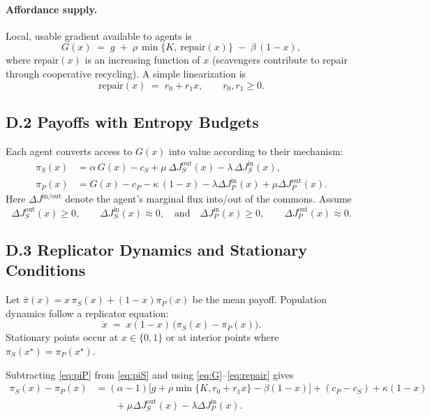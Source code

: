 \documentclass[11pt,a4paper,titlepage]{article}
\theoremstyle{definition}
\begin{document}
\paragraph{Affordance supply.}
Local, usable gradient available to agents is
\begin{equation}
G(x) \;=\; g \;+\; \rho\,\min\{K,~\text{repair}(x)\} \;-\; \beta\,(1-x),
\label{eq:G}
\end{equation}
where $\text{repair}(x)$ is an increasing function of $x$ (scavengers contribute to repair through cooperative recycling). A simple linearization is
\begin{equation}
\text{repair}(x) \;=\; r_0 + r_1 x,\qquad r_0,r_1\ge 0.
\label{eq:repair}
\end{equation}

\subsection*{D.2 Payoffs with Entropy Budgets}

Each agent converts access to $G(x)$ into value according to their mechanism:
\begin{align}
\pi_S(x) &= \alpha\,G(x) - c_S + \mu\, \Delta J_S^{\text{out}}(x) - \lambda\, \Delta J_S^{\text{in}}(x),
\label{eq:piS}\\
\pi_P(x) &= G(x) - c_P - \kappa\,(1-x) - \lambda \Delta J_P^{\text{in}}(x) + \mu \Delta J_P^{\text{out}}(x).
\label{eq:piP}
\end{align}
Here $\Delta J^{\text{in/out}}$ denote the agent’s marginal flux into/out of the commons. Assume
\[
\Delta J_S^{\text{out}}(x) \ge 0,\qquad \Delta J_S^{\text{in}}(x)\approx 0,
\quad\text{and}\quad
\Delta J_P^{\text{in}}(x)\ge 0,\qquad \Delta J_P^{\text{out}}(x)\approx 0.
\]

\subsection*{D.3 Replicator Dynamics and Stationary Conditions}

Let $\bar{\pi}(x) = x\,\pi_S(x) + (1-x)\pi_P(x)$ be the mean payoff. Population dynamics follow a replicator equation:
\begin{equation}
\dot{x} \;=\; x(1-x)\,\big(\pi_S(x)-\pi_P(x)\big).
\label{eq:replicator}
\end{equation}
Stationary points occur at $x\in\{0,1\}$ or at interior points where $\pi_S(x^\star)=\pi_P(x^\star)$.

Subtracting \eqref{eq:piP} from \eqref{eq:piS} and using \eqref{eq:G}–\eqref{eq:repair} gives
\begin{align}
\pi_S(x)-\pi_P(x)
&= (\alpha-1)\Big[g + \rho \min\{K,r_0+r_1x\}-\beta(1-x)\Big] + (c_P-c_S) + \kappa(1-x)
\nonumber\\
&\qquad {} + \mu\Delta J_S^{\text{out}}(x) - \lambda \Delta J_P^{\text{in}}(x).
\label{eq:diff}
\end{align}
\end{document}
